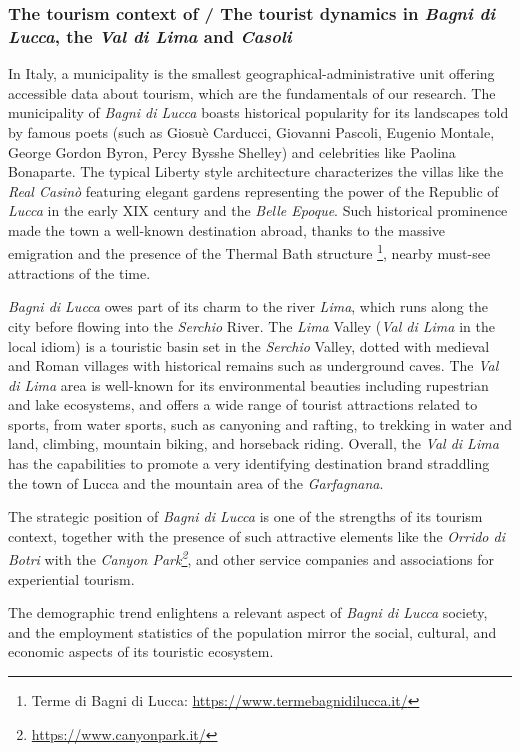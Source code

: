 \documentclass[sustainability,article,submit,pdftex,moreauthors]{Definitions/mdpi}
\begin{document}
\subsubsection{The tourism context of / The tourist dynamics in \emph{Bagni di Lucca}, the \emph{Val di Lima} and \emph{Casoli}}

In Italy, a municipality is the smallest geographical-administrative unit offering accessible data about tourism, which are the fundamentals of our research. The municipality of \emph{Bagni di Lucca} boasts historical popularity for its landscapes told by famous poets (such as Giosuè Carducci, Giovanni Pascoli, Eugenio Montale, George Gordon Byron, Percy Bysshe Shelley) and celebrities like Paolina Bonaparte. The typical Liberty style architecture characterizes the villas like the \textit{Real Casinò} featuring elegant gardens representing the power of the Republic of \emph{Lucca} in the early XIX century and the \emph{Belle Epoque}. Such historical prominence made the town a well-known destination abroad, thanks to the massive emigration and the presence of the Thermal Bath structure \footnote{Terme di Bagni di Lucca: \url{https://www.termebagnidilucca.it/}}, nearby must-see attractions of the time.

\emph{Bagni di Lucca} owes part of its charm to the river \emph{Lima}, which runs along the city before flowing into the \textit{Serchio} River. The \emph{Lima} Valley (\emph {Val di Lima} in the local idiom) is a touristic basin set in the \textit{Serchio} Valley, dotted with medieval and Roman villages with historical remains such as underground caves. The \emph{Val di Lima} area is well-known for its environmental beauties including rupestrian and lake ecosystems, and offers a wide range of tourist attractions related to sports, from water sports, such as canyoning and rafting, to trekking in water and land, climbing, mountain biking, and horseback riding. Overall, the \emph{Val di Lima} has the capabilities to promote a very identifying destination brand straddling the town of Lucca and the mountain area of the \textit{Garfagnana}.

The strategic position of \emph{Bagni di Lucca} is one of the strengths of its tourism context, together with the presence of such attractive elements like the \emph{Orrido di Botri} with the \emph{Canyon Park\footnote{\url{ https://www.canyonpark.it/}}}, and other service companies and associations for experiential tourism.

The demographic trend enlightens a relevant aspect of \emph{Bagni di Lucca} society, and the employment statistics of the population mirror the social, cultural, and economic aspects of its touristic ecosystem.
\end{document}
